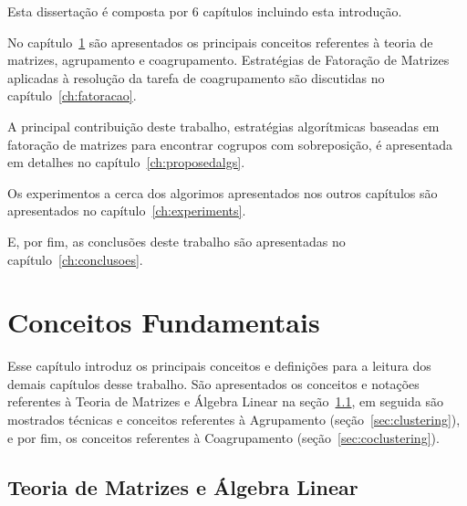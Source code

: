 \documentclass[
    12pt,                %
    oneside,            %
    a4paper,            %
    english,            %
    brazil                %
    ]{abntex2ppgsi}
\begin{document}
Esta dissertação é composta por $6$ capítulos incluindo esta introdução.

No capítulo~\ref{ch:conceitos} são apresentados os principais conceitos referentes à teoria de matrizes, agrupamento e coagrupamento.
Estratégias de Fatoração de Matrizes aplicadas à resolução da tarefa de coagrupamento são discutidas no capítulo~\ref{ch:fatoracao}.

A principal contribuição deste trabalho, estratégias algorítmicas baseadas em fatoração de matrizes para encontrar cogrupos com sobreposição, é apresentada em detalhes no capítulo~\ref{ch:proposedalgs}.

Os experimentos a cerca dos algorimos apresentados nos outros capítulos são apresentados no capítulo~\ref{ch:experiments}.

E, por fim, as conclusões deste trabalho são apresentadas no capítulo~\ref{ch:conclusoes}.


\chapter{Conceitos Fundamentais}
\label{ch:conceitos}

Esse capítulo introduz os principais conceitos e definições para a leitura dos demais capítulos desse trabalho. São apresentados os conceitos e notações referentes à Teoria de Matrizes e Álgebra Linear na seção~\ref{sec:matrix-alglin}, em seguida são mostrados técnicas e conceitos referentes à Agrupamento (seção~\ref{sec:clustering}), e por fim, os conceitos referentes à Coagrupamento (seção~\ref{sec:coclustering}).

\section{Teoria de Matrizes e Álgebra Linear}
\label{sec:matrix-alglin}
\end{document}
